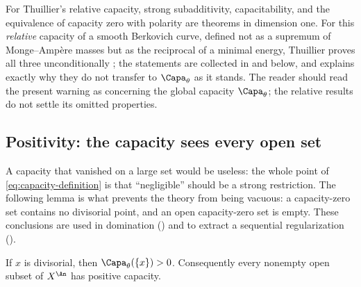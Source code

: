 \begin{remark}
\label{rem:ch25-curve-choquet-unconditional}
For Thuillier's relative capacity, strong subadditivity, capacitability,
and the equivalence of capacity zero with polarity are theorems in
dimension one.  For this \emph{relative} capacity of a smooth
Berkovich curve, defined not as a supremum of Monge--Amp\`ere masses but as
the reciprocal of a minimal energy, Thuillier proves all three
unconditionally \cite[\S3.6]{Thu05}; the statements are collected in
 and
 below, and
 explains exactly why they do not transfer
to $\Capa_\theta$ as it stands.  The reader should read the present
warning as concerning the global capacity $\Capa_\theta$; the relative
results do not settle its omitted properties.
\end{remark}

\subsection{Positivity: the capacity sees every open set}
\label{sec:ch25-positivity}

A capacity that vanished on a large set would be useless: the whole point of
\eqref{eq:capacity-definition} is that ``negligible'' should be a strong
restriction.  The following lemma is what prevents the theory from being
vacuous: a capacity-zero set contains no divisorial point, and an open
capacity-zero set is empty.  These conclusions are used in domination
() and to
extract a sequential regularization
().

\begin{lemma}
\label{lem:divisorial-positive-capacity}
If $x$ is divisorial, then $\Capa_\theta(\{x\})>0$. Consequently every
nonempty open subset of $X^{\An}$ has positive capacity.
\end{lemma}

